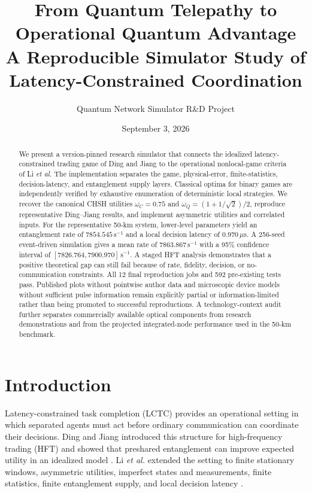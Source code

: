 \documentclass[10pt]{article}
\title{From Quantum Telepathy to Operational Quantum Advantage\\
\large A Reproducible Simulator Study of Latency-Constrained Coordination}
\author{Quantum Network Simulator R\&D Project}
\date{September 3, 2026}
\begin{document}
\maketitle

\begin{abstract}
We present a version-pinned research simulator that connects the idealized
latency-constrained trading game of Ding and Jiang to the operational
nonlocal-game criteria of Li \emph{et al.}  The implementation separates the
game, physical-error, finite-statistics, decision-latency, and entanglement
supply layers.  Classical optima for binary games are independently verified
by exhaustive enumeration of deterministic local strategies.  We recover the
canonical CHSH utilities $\omega_C=0.75$ and
$\omega_Q=(1+1/\sqrt{2})/2$, reproduce representative Ding--Jiang results,
and implement asymmetric utilities and correlated inputs.  For the
representative 50-km system, lower-level parameters yield an entanglement rate
of $7854.545\,\mathrm{s}^{-1}$ and a local decision latency of
$0.970\,\mu\mathrm{s}$.  A 256-seed event-driven simulation gives a mean rate
of $7863.867\,\mathrm{s}^{-1}$ with a 95\% confidence interval of
$[7826.764,7900.970]\,\mathrm{s}^{-1}$.  A staged HFT analysis demonstrates
that a positive theoretical gap can still fail because of rate, fidelity,
decision, or no-communication constraints.  All 12 final reproduction jobs
and 592 pre-existing tests pass.  Published plots without pointwise author
data and microscopic device models without sufficient pulse information
remain explicitly partial or information-limited rather than being promoted
to successful reproductions.  A technology-context audit further separates
commercially available optical components from research demonstrations and
from the projected integrated-node performance used in the 50-km benchmark.
\end{abstract}

\section{Introduction}

Latency-constrained task completion (LCTC) provides an operational setting in
which separated agents must act before ordinary communication can coordinate
their decisions.  Ding and Jiang introduced this structure for high-frequency
trading (HFT) and showed that preshared entanglement can improve expected
utility in an idealized model \cite{dingjiang2025}.  Li \emph{et al.} extended
the setting to finite stationary windows, asymmetric utilities, imperfect
states and measurements, finite statistics, finite entanglement supply, and
local decision latency \cite{li2026}.
\end{document}
